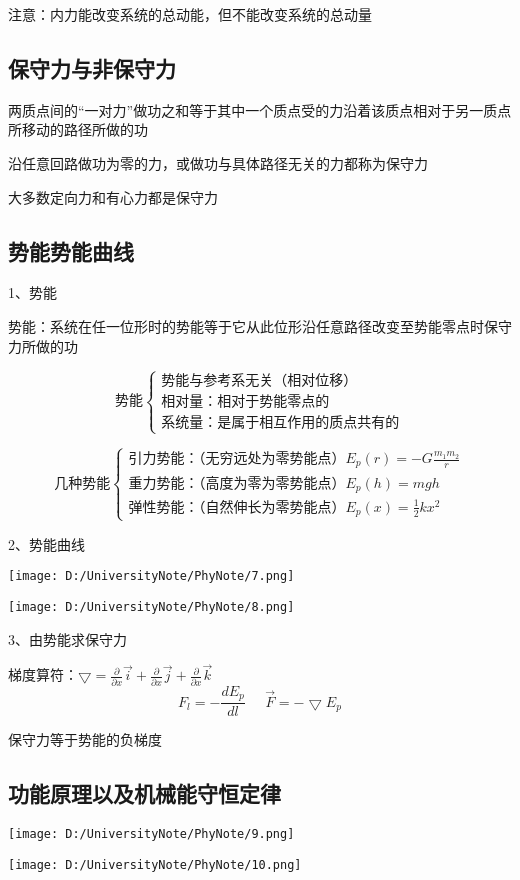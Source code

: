 \documentclass[UTF8]{article}
\begin{document}
    注意：内力能改变系统的总动能，但不能改变系统的总动量

\subsection{保守力与非保守力}

    两质点间的“一对力”做功之和等于其中一个质点受的力沿着该质点相对于另一质点所移动的路径所做的功

    沿任意回路做功为零的力，或做功与具体路径无关的力都称为保守力

    大多数定向力和有心力都是保守力

\subsection{势能\;\;势能曲线}

    1、势能

    势能：系统在任一位形时的势能等于它从此位形沿任意路径改变至势能零点时保守力所做的功

    \[\mbox{势能}\left\{
        \begin{aligned}
        \mbox{势能与参考系无关（相对位移）     } \\
        \mbox{相对量：相对于势能零点的         } \\
        \mbox{系统量：是属于相互作用的质点共有的}
        \end{aligned}
        \right.\]
    
    \[\mbox{几种势能}\left\{
        \begin{aligned}
        \mbox{引力势能：（无穷远处为零势能点）} E_p(r) = -G\frac{m_1m_2}{r}\\
        \mbox{重力势能：（高度为零为零势能点）} E_p(h) = mgh\\
        \mbox{弹性势能：（自然伸长为零势能点）} E_p(x) = \frac{1}{2}kx^2
        \end{aligned}
        \right.\]
    
    2、势能曲线

    \texttt{[image: D:/UniversityNote/PhyNote/7.png]}
    
    \texttt{[image: D:/UniversityNote/PhyNote/8.png]}

    3、由势能求保守力

    梯度算符：$\bigtriangledown = \frac{\partial}{\partial x}\vec{i} + \frac{\partial}{\partial x}\vec{j} + \frac{\partial}{\partial x}\vec{k}$
    \[F_l = -\frac{dE_p}{dl}\;\;\;\;\;\vec{F} = -\bigtriangledown E_p\]

    保守力等于势能的负梯度

\subsection{功能原理以及机械能守恒定律}

    \texttt{[image: D:/UniversityNote/PhyNote/9.png]}

    \texttt{[image: D:/UniversityNote/PhyNote/10.png]}
\end{document}
